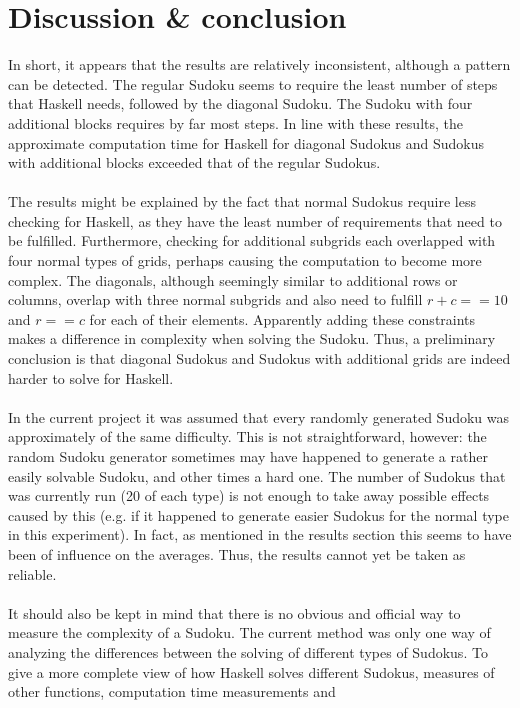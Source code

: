 \documentclass[12pt,a4paper]{article}
\begin{document}
\section{Discussion \& conclusion}
In short, it appears that the results are relatively inconsistent, although a pattern
can be detected. The regular Sudoku seems to require the least number of steps that
Haskell needs, followed by the diagonal Sudoku. The Sudoku with four additional blocks
requires by far most steps. In line with these results, the approximate computation time
for Haskell for diagonal Sudokus and Sudokus with additional blocks exceeded that of the regular
Sudokus.\\\\
The results might be explained by the fact that normal Sudokus require less checking
for Haskell, as they have the least number of requirements that need to be fulfilled.
Furthermore, checking for additional subgrids each overlapped with four normal types of grids,
perhaps causing the computation to become more complex. The diagonals, although seemingly similar to additional rows
or columns, overlap with three normal subgrids and also need to fulfill $r + c == 10$ and $r == c$ for each of
their elements. Apparently adding these constraints makes a difference in complexity when solving the Sudoku. Thus, a preliminary conclusion
is that diagonal Sudokus and Sudokus with additional grids are indeed harder to solve
for Haskell.\\\\
In the current project it was assumed that every randomly generated Sudoku was
approximately of the same difficulty. This is not straightforward, however: the random Sudoku generator sometimes may have happened to generate
a rather easily solvable Sudoku, and other times a hard one. The number of Sudokus that
was currently run (20 of each type) is not enough to take away possible effects caused by this (e.g. if it happened to generate easier Sudokus
for the normal type in this experiment). In fact, as mentioned
in the results section this seems to have been of influence on the averages. Thus, the
results cannot yet be taken as reliable.\\\\
It should also be kept in mind that there is no obvious and official way to measure the
complexity of a Sudoku. The current method was only one way of analyzing the differences
between the solving of different types of Sudokus. To give a more complete view of
how Haskell solves different Sudokus, measures of other functions, computation time measurements and
\end{document}
